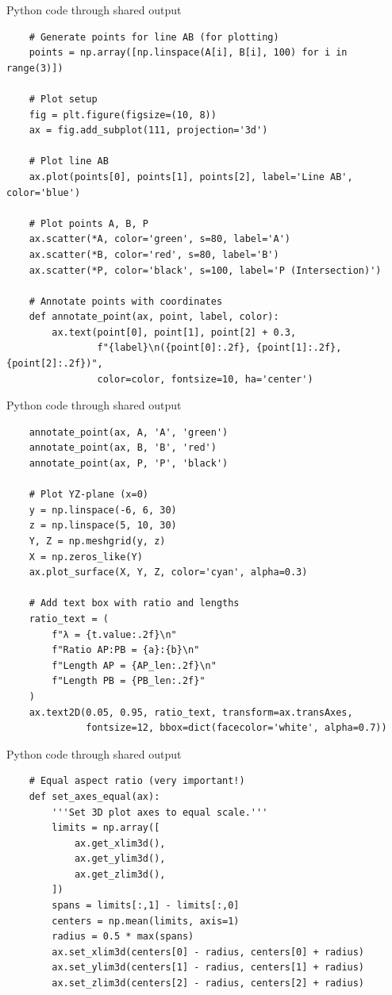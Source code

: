 \documentclass{beamer}
\begin{document}
\begin{frame}[fragile]{Python code through shared output}
\begin{lstlisting}
    # Generate points for line AB (for plotting)
    points = np.array([np.linspace(A[i], B[i], 100) for i in range(3)])

    # Plot setup
    fig = plt.figure(figsize=(10, 8))
    ax = fig.add_subplot(111, projection='3d')

    # Plot line AB
    ax.plot(points[0], points[1], points[2], label='Line AB', color='blue')

    # Plot points A, B, P
    ax.scatter(*A, color='green', s=80, label='A')
    ax.scatter(*B, color='red', s=80, label='B')
    ax.scatter(*P, color='black', s=100, label='P (Intersection)')

    # Annotate points with coordinates
    def annotate_point(ax, point, label, color):
        ax.text(point[0], point[1], point[2] + 0.3,
                f"{label}\n({point[0]:.2f}, {point[1]:.2f}, {point[2]:.2f})",
                color=color, fontsize=10, ha='center')
 \end{lstlisting}
\end{frame}
\begin{frame}[fragile]{Python code through shared output}
\begin{lstlisting}
    annotate_point(ax, A, 'A', 'green')
    annotate_point(ax, B, 'B', 'red')
    annotate_point(ax, P, 'P', 'black')

    # Plot YZ-plane (x=0)
    y = np.linspace(-6, 6, 30)
    z = np.linspace(5, 10, 30)
    Y, Z = np.meshgrid(y, z)
    X = np.zeros_like(Y)
    ax.plot_surface(X, Y, Z, color='cyan', alpha=0.3)

    # Add text box with ratio and lengths
    ratio_text = (
        f"λ = {t.value:.2f}\n"
        f"Ratio AP:PB = {a}:{b}\n"
        f"Length AP = {AP_len:.2f}\n"
        f"Length PB = {PB_len:.2f}"
    )
    ax.text2D(0.05, 0.95, ratio_text, transform=ax.transAxes,
              fontsize=12, bbox=dict(facecolor='white', alpha=0.7))
 \end{lstlisting}
\end{frame}
\begin{frame}[fragile]{Python code through shared output}
\begin{lstlisting}
    # Equal aspect ratio (very important!)
    def set_axes_equal(ax):
        '''Set 3D plot axes to equal scale.'''
        limits = np.array([
            ax.get_xlim3d(),
            ax.get_ylim3d(),
            ax.get_zlim3d(),
        ])
        spans = limits[:,1] - limits[:,0]
        centers = np.mean(limits, axis=1)
        radius = 0.5 * max(spans)
        ax.set_xlim3d(centers[0] - radius, centers[0] + radius)
        ax.set_ylim3d(centers[1] - radius, centers[1] + radius)
        ax.set_zlim3d(centers[2] - radius, centers[2] + radius)
 \end{lstlisting}
\end{frame}
\end{document}
